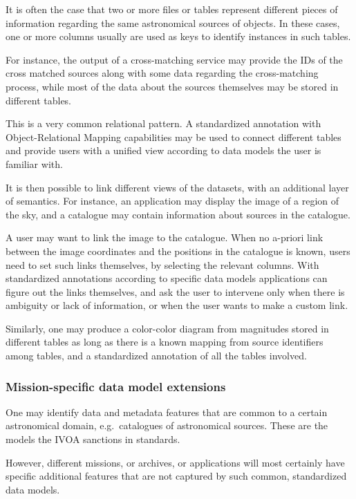 \documentclass[11pt,a4paper]{ivoa}
\begin{document}
It is often the case that two or more files or tables represent
different pieces of information regarding the same astronomical sources
of objects. In these cases, one or more columns usually are used as keys
to identify instances in such tables.

For instance, the output of a cross-matching service may provide the IDs
of the cross matched sources along with some data regarding the
cross-matching process, while most of the data about the sources
themselves may be stored in different tables.

This is a very common relational pattern. A standardized annotation with
Object-Relational Mapping capabilities may be used to connect different
tables and provide users with a unified view according to data models
the user is familiar with.

It is then possible to link different views of the datasets, with an
additional layer of semantics. For instance, an application may display
the image of a region of the sky, and a catalogue may contain
information about sources in the catalogue.

A user may want to link the image to the catalogue. When no a-priori
link between the image coordinates and the positions in the catalogue is
known, users need to set such links themselves, by selecting the
relevant columns. With standardized annotations according to specific
data models applications can figure out the links themselves, and ask
the user to intervene only when there is ambiguity or lack of
information, or when the user wants to make a custom link.

Similarly, one may produce a color-color diagram from magnitudes stored
in different tables as long as there is a known mapping from source
identifiers among tables, and a standardized annotation of all the
tables involved.

\subsubsection{Mission-specific data model
extensions}\label{mission-specific-data-model-extensions}

One may identify data and metadata features that are common to a certain
astronomical domain, e.g.~catalogues of astronomical sources. These are
the models the IVOA sanctions in standards.

However, different missions, or archives, or applications will most
certainly have specific additional features that are not captured by
such common, standardized data models.
\end{document}
